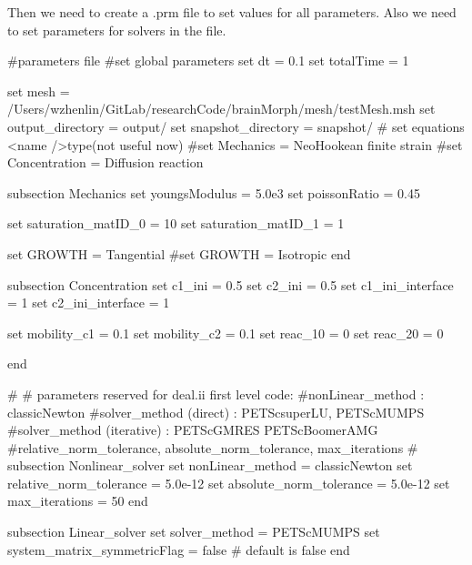  Then we need to create a {\ttfamily }.prm file to set values for all parameters. Also we need to set parameters for solvers in the file. 
\begin{DoxyCode}
\textcolor{preprocessor}{#parameters file}
\textcolor{preprocessor}{}
\textcolor{preprocessor}{#set global parameters}
\textcolor{preprocessor}{}set dt = 0.1
set totalTime = 1

set mesh = /Users/wzhenlin/GitLab/researchCode/brainMorph/mesh/testMesh.msh
set output\_directory = output/
set snapshot\_directory = snapshot/
\textcolor{preprocessor}{# set equations <name />type(not useful now)}
\textcolor{preprocessor}{}
\textcolor{preprocessor}{#set Mechanics = NeoHookean finite strain}
\textcolor{preprocessor}{}\textcolor{preprocessor}{#set Concentration = Diffusion reaction}
\textcolor{preprocessor}{}

subsection Mechanics
        set youngsModulus =  5.0e3
        set poissonRatio =  0.45
            
        set saturation\_matID\_0 = 10
        set saturation\_matID\_1 = 1
        
     set GROWTH = Tangential
\textcolor{preprocessor}{        #set GROWTH = Isotropic}
\textcolor{preprocessor}{}end

subsection Concentration
        set c1\_ini = 0.5
        set c2\_ini = 0.5
        set c1\_ini\_interface = 1
        set c2\_ini\_interface = 1
                        
        set mobility\_c1 = 0.1
     set mobility\_c2 = 0.1
     set reac\_10 = 0
        set reac\_20 = 0

end
                        
\textcolor{preprocessor}{#}
\textcolor{preprocessor}{}\textcolor{preprocessor}{# parameters reserved for deal.ii first level code:}
\textcolor{preprocessor}{}\textcolor{preprocessor}{#nonLinear\_method : classicNewton}
\textcolor{preprocessor}{}\textcolor{preprocessor}{#solver\_method (direct) : PETScsuperLU, PETScMUMPS}
\textcolor{preprocessor}{}\textcolor{preprocessor}{#solver\_method (iterative) : PETScGMRES PETScBoomerAMG}
\textcolor{preprocessor}{}\textcolor{preprocessor}{#relative\_norm\_tolerance, absolute\_norm\_tolerance, max\_iterations}
\textcolor{preprocessor}{}\textcolor{preprocessor}{#}
\textcolor{preprocessor}{}subsection Nonlinear\_solver
        set nonLinear\_method = classicNewton
        set relative\_norm\_tolerance = 5.0e-12
        set absolute\_norm\_tolerance = 5.0e-12
        set max\_iterations = 50
end
                        
subsection Linear\_solver
        set solver\_method = PETScMUMPS
        set system\_matrix\_symmetricFlag = \textcolor{keyword}{false} # \textcolor{keywordflow}{default} is \textcolor{keyword}{false}
end
\end{DoxyCode}
